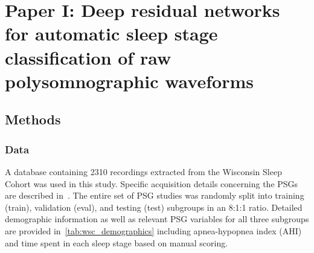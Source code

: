 \section{Paper I: Deep residual networks for automatic sleep stage classification of raw polysomnographic waveforms}\label{sec:paperi}
\subsection{Methods}
\subsubsection{Data}
A database containing 2310 recordings extracted from the Wisconsin Sleep Cohort was used in this study.
Specific acquisition details concerning the PSGs are described in~\cite{Young2008}.
The entire set of PSG studies was randomly split into training (train), validation (eval), and testing (test) subgroups in an 8:1:1 ratio.
Detailed demographic information as well as relevant PSG variables for all three subgroups are provided in~\cref{tab:wsc_demographics} including apnea-hypopnea index (AHI) and time spent in each sleep stage based on manual scoring. %
